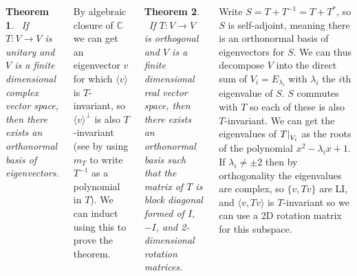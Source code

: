 \documentclass{tikzposter} %
\newcommand\restr[2]{{%
  \left.\kern-\nulldelimiterspace %
  #1 %
  \right|_{#2} %
  }}
\newtheorem{theorem}{Theorem}
\begin{document}
\begin{columns}
{       \begin{theorem}
       \ If $T : V \to V$ is unitary and $V$ is a finite dimensional complex vector space, then there exists an orthonormal basis of eigenvectors.
       \end{theorem}
       \hphantom{}

       By algebraic closure of $\mathbb{C}$ we can get an eigenvector $v$ for which $\langle v \rangle$ is $T$-invariant, so $\langle v \rangle^{\bot}$ is also $T$-invariant (see by using $m_{T}$ to write $T^{-1}$ as a polynomial in $T$). We can induct using this to prove the theorem. \\

       \begin{theorem}
       \ If $T : V \to V$ is orthogonal and $V$ is a finite dimensional real vector space, then there exists an orthonormal basis such that the matrix of $T$ is block diagonal formed of $I$, $-I$, and 2-dimensional rotation matrices.
       \end{theorem}
       \hphantom{}

       Write $S = T + T^{-1} = T + T^*$, so $S$ is self-adjoint, meaning there is an orthonormal basis of eigenvectors for $S$. We can thus decompose $V$ into the direct sum of $V_{i} = E_{\lambda_{i}}$ with $\lambda_{i}$ the $i$th eigenvalue of $S$. $S$ commutes with $T$ so each of these is also $T$-invariant. We can get the eigenvalues of $\restr{T}{V_{i}}$ as the roots of the polynomial $x^{2} - \lambda_{i} x + 1$. If $\lambda_{i} \neq \pm 2$ then by orthogonality the eigenvalues are complex, so $\{v, Tv\}$ are LI, and $\langle v, Tv \rangle$ is $T$-invariant so we can use a 2D rotation matrix for this subspace.
       }
\end{columns}
\end{document}
